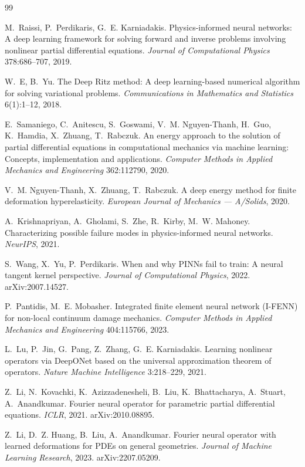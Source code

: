 \documentclass[11pt]{article}
\begin{document}
\begin{thebibliography}{99}
\small

M.~Raissi, P.~Perdikaris, G.~E. Karniadakis.
Physics-informed neural networks: A deep learning framework for solving
forward and inverse problems involving nonlinear partial differential
equations. \emph{Journal of Computational Physics} 378:686--707, 2019.

W.~E, B.~Yu.
The Deep Ritz method: A deep learning-based numerical algorithm for solving
variational problems. \emph{Communications in Mathematics and Statistics}
6(1):1--12, 2018.

E.~Samaniego, C.~Anitescu, S.~Goswami, V.~M. Nguyen-Thanh, H.~Guo,
K.~Hamdia, X.~Zhuang, T.~Rabczuk.
An energy approach to the solution of partial differential equations in
computational mechanics via machine learning: Concepts, implementation and
applications. \emph{Computer Methods in Applied Mechanics and Engineering}
362:112790, 2020.

V.~M. Nguyen-Thanh, X.~Zhuang, T.~Rabczuk.
A deep energy method for finite deformation hyperelasticity.
\emph{European Journal of Mechanics --- A/Solids}, 2020.

A.~Krishnapriyan, A.~Gholami, S.~Zhe, R.~Kirby, M.~W. Mahoney.
Characterizing possible failure modes in physics-informed neural networks.
\emph{NeurIPS}, 2021.

S.~Wang, X.~Yu, P.~Perdikaris.
When and why PINNs fail to train: A neural tangent kernel perspective.
\emph{Journal of Computational Physics}, 2022. arXiv:2007.14527.

P.~Pantidis, M.~E. Mobasher.
Integrated finite element neural network (I-FENN) for non-local continuum
damage mechanics. \emph{Computer Methods in Applied Mechanics and
Engineering} 404:115766, 2023.

L.~Lu, P.~Jin, G.~Pang, Z.~Zhang, G.~E. Karniadakis.
Learning nonlinear operators via DeepONet based on the universal
approximation theorem of operators. \emph{Nature Machine Intelligence}
3:218--229, 2021.

Z.~Li, N.~Kovachki, K.~Azizzadenesheli, B.~Liu, K.~Bhattacharya, A.~Stuart,
A.~Anandkumar.
Fourier neural operator for parametric partial differential equations.
\emph{ICLR}, 2021. arXiv:2010.08895.

Z.~Li, D.~Z. Huang, B.~Liu, A.~Anandkumar.
Fourier neural operator with learned deformations for PDEs on general
geometries. \emph{Journal of Machine Learning Research}, 2023.
arXiv:2207.05209.


\end{thebibliography}
\end{document}
